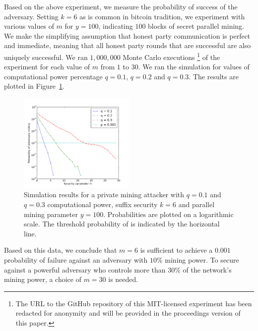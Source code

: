 Based on the above experiment, we measure the probability of success of the
adversary. Setting $k = 6$ as is common in bitcoin tradition, we experiment
with various values of $m$ for $y = 100$, indicating $100$ blocks of secret
parallel mining. We make the simplifying assumption that honest party
communication is perfect and immediate, meaning that all honest party rounds
that are successful are also uniquely successful. We ran $1,000,000$ Monte
Carlo executions \footnote{The URL to the GitHub repository of this
MIT-licensed experiment has been redacted for anonymity and will be provided in
the proceedings version of this paper.} of the experiment for each value of $m$
from $1$ to $30$. We ran the simulation for values of computational power
percentage $q = 0.1$, $q = 0.2$ and $q = 0.3$. The results are plotted in
Figure~\ref{fig.nipopow-attack-experiment}.

\begin{figure}[h]
    \caption{\label{fig.nipopow-attack-experiment}
        Simulation results for a private mining attacker with $q = 0.1$ and $q
        = 0.3$ computational power, suffix security $k = 6$ and parallel
        mining parameter $y = 100$. Probabilities are plotted on a logarithmic
        scale. The threshold probability of \cite{bitcoin} is indicated by the
        horizontal line.
    }
    \centering
    \includegraphics[width=0.5\textwidth,keepaspectratio]{figures/nipopow-attack-experiment.png}
\end{figure}

Based on this data, we conclude that $m = 6$ is sufficient to achieve a $0.001$
probability of failure against an adversary with $10\%$ mining power. To secure
against a powerful adversary who controls more than $30\%$ of the network's
mining power, a choice of $m = 30$ is needed.
